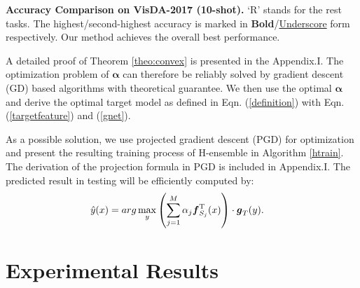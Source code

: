 \documentclass[letterpaper]{article} %
\begin{document}
\begin{table*}[!h]
    \caption{\textbf{Accuracy Comparison on VisDA-2017 (10-shot).} `R' stands for the rest tasks. The highest/second-highest accuracy is marked in \textbf{Bold}/\underline{Underscore} form respectively. Our method achieves the overall best performance.
    }
    \label{tab:comparison}
\end{table*}


 A detailed proof of Theorem \ref{theo:convex} is presented in the Appendix.I. The optimization problem of $\boldsymbol{\alpha}$ can therefore be reliably solved by gradient descent (GD) based algorithms with theoretical guarantee. We then use the optimal $\boldsymbol{\alpha}$ and derive the optimal target model as defined in Eqn. (\ref{definition}) with Eqn. (\ref{targetfeature}) and (\ref{gnet}).
 

As a possible solution, we use projected gradient descent (PGD) for optimization and present the resulting training process of H-ensemble in Algorithm \ref{htrain}. The derivation of the projection formula in PGD is included in Appendix.I. The predicted result in testing will be efficiently computed by:
\begin{equation}
    \begin{aligned}
            \hat{y}(x) &= arg\max_y \left(\sum_{j = 1}^{M} \alpha_j \boldsymbol{f}_{S_j}^{\rm T}(x)\right)\cdot\boldsymbol{g}_T(y).
    \end{aligned}
\end{equation}









\section{Experimental Results}\label{exp}
\end{document}
